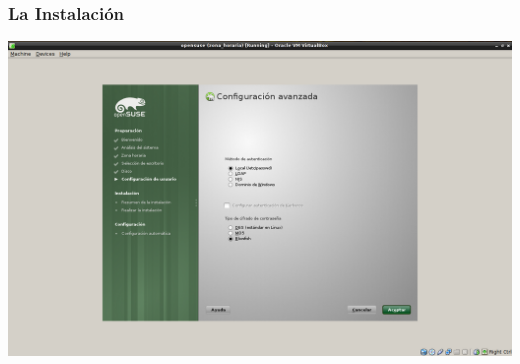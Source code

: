 \documentclass{beamer}
\begin{document}
\begin{frame}
\frametitle{La Instalaci\'on}
\includegraphics[height=0.8\textheight]{12.png} \hspace*{7.3cm}
\end{frame} 
\end{document}
